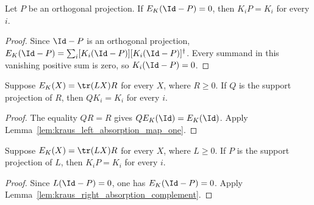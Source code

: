 \begin{lemma}
    \label{lem:kraus_right_absorption_complement}
    \leanok
    Let $P$ be an orthogonal projection. If
    $E_K(\Id-P)=0$, then $K_iP=K_i$ for every $i$.
\end{lemma}

\begin{proof}\leanok
    Since $\Id-P$ is an orthogonal projection,
    $E_K(\Id-P)=\sum_i [K_i(\Id-P)][K_i(\Id-P)]^\dagger$.
    Every summand in this vanishing positive sum is zero, so
    $K_i(\Id-P)=0$.
\end{proof}

\begin{lemma}
    \label{lem:kraus_output_support_absorption}
    \leanok
    Suppose $E_K(X)=\tr(LX)R$ for every $X$, where $R\ge0$. If $Q$ is
    the support projection of $R$, then $QK_i=K_i$ for every $i$.
\end{lemma}

\begin{proof}\leanok
    The equality $QR=R$ gives $Q E_K(\Id)=E_K(\Id)$. Apply
    Lemma~\ref{lem:kraus_left_absorption_map_one}.
\end{proof}

\begin{lemma}
    \label{lem:kraus_input_support_absorption}
    \leanok
    Suppose $E_K(X)=\tr(LX)R$ for every $X$, where $L\ge0$. If $P$ is
    the support projection of $L$, then $K_iP=K_i$ for every $i$.
\end{lemma}

\begin{proof}\leanok
    Since $L(\Id-P)=0$, one has $E_K(\Id-P)=0$. Apply
    Lemma~\ref{lem:kraus_right_absorption_complement}.
\end{proof}
